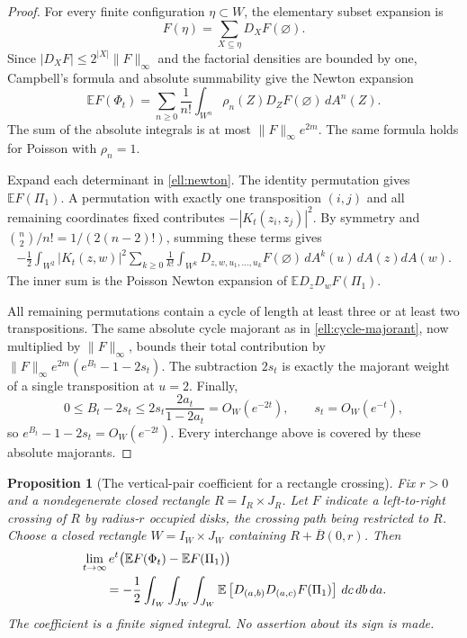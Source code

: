 \documentclass[11pt,a4paper]{article}
\newtheorem{proposition}[theorem]{Proposition}
\theoremstyle{definition}
\theoremstyle{remark}
\numberwithin{equation}{section}
\begin{document}
\begin{proof}
For every finite configuration $\eta\subset W$, the elementary
subset expansion is
\[
 F(\eta)=\sum_{X\subseteq\eta}D_XF(\varnothing).
\]
Since $|D_XF|\le2^{|X|}\|F\|_\infty$ and the factorial
densities are bounded by one, Campbell's formula and absolute
summability give the Newton expansion
\begin{equation}\label{ell:newton}
 \mathbb EF(\Phi_t)=\sum_{n\ge0}\frac1{n!}
      \int_{W^n}\rho_n(Z)D_ZF(\varnothing)\,dA^n(Z).
\end{equation}
The sum of the absolute integrals is at most
$\|F\|_\infty e^{2m}$.  The same formula holds for Poisson
with $\rho_n=1$.

Expand each determinant in \eqref{ell:newton}.  The identity
permutation gives $\mathbb EF(\Pi_1)$.  A permutation with
exactly one transposition $(i,j)$ and all remaining coordinates
fixed contributes $-|K_t(z_i,z_j)|^2$.  By symmetry and
$\binom n2/n!=1/(2(n-2)!)$, summing these terms gives
\begin{align*}
 -\frac12\int_{W^2}|K_t(z,w)|^2
  \sum_{k\ge0}\frac1{k!}\int_{W^k}
      D_{z,w,u_1,\ldots,u_k}F(\varnothing)\,dA^k(u)
                  \,dA(z)dA(w).
\end{align*}
The inner sum is the Poisson Newton expansion of
$\mathbb E D_zD_wF(\Pi_1)$.

All remaining permutations contain a cycle of length at least
three or at least two transpositions.  The same absolute cycle
majorant as in \eqref{ell:cycle-majorant}, now multiplied by
$\|F\|_\infty$, bounds their total contribution by
$\|F\|_\infty e^{2m}(e^{B_t}-1-2s_t)$.
The subtraction $2s_t$ is exactly the majorant weight of a single
transposition at $u=2$.  Finally,
\[
 0\le B_t-2s_t
 \le 2s_t\frac{2a_t}{1-2a_t}=O_W(e^{-2t}),
 \qquad s_t=O_W(e^{-t}),
\]
so $e^{B_t}-1-2s_t=O_W(e^{-2t})$.  Every interchange above
is covered by these absolute majorants.
\end{proof}

\begin{proposition}[The vertical-pair coefficient for a rectangle crossing]
\label{ell:vertical-coefficient}
Fix $r>0$ and a nondegenerate closed rectangle
$R=I_R\times J_R$.  Let $F$ indicate a left-to-right crossing
of $R$ by radius-$r$ occupied disks, the crossing path being
restricted to $R$.  Choose a closed rectangle
$W=I_W\times J_W$ containing
$R+\overline B(0,r)$.  Then
\begin{align}
 &\lim_{t\to\infty}e^t
       \bigl(\mathbb EF(\Phi_t)-\mathbb EF(\Pi_1)\bigr)
 \notag\\
 &\qquad=-\frac12\int_{I_W}\int_{J_W}\int_{J_W}
       \mathbb E\left[D_{(a,b)}D_{(a,c)}F(\Pi_1)\right]
                  \,dc\,db\,da.\label{ell:vertical-limit}
\end{align}
The coefficient is a finite signed integral.  No assertion about
its sign is made.
\end{proposition}
\end{document}
